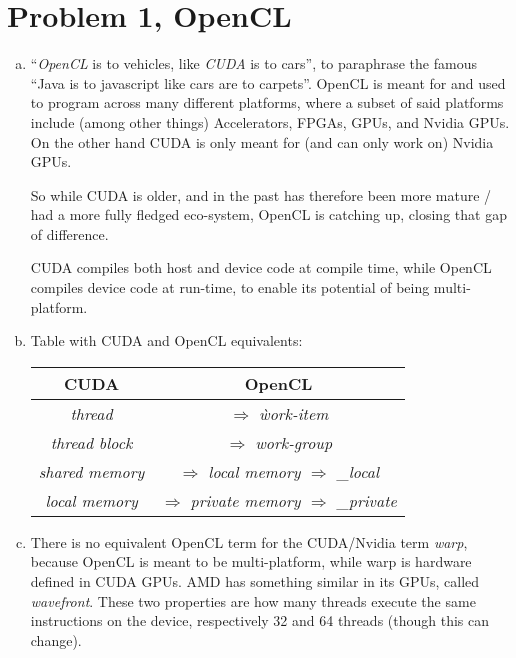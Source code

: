 \documentclass[fontsize=11pt, paper=a4, titlepage]{article}
\begin{document}
\section*{Problem 1, OpenCL}
    \begin{enumerate}[a)]

        \item ``\textit{OpenCL} is to vehicles, like \textit{CUDA} is to cars'',
to paraphrase the famous ``Java is to javascript like cars are to carpets''.
OpenCL is meant for and used to program across many different platforms, where a
subset of said platforms include (among other things) Accelerators, FPGAs, GPUs,
and Nvidia GPUs. On the other hand CUDA is only meant for (and can only work on)
Nvidia GPUs.

So while CUDA is older, and in the past has therefore been more mature / had a
more fully fledged eco-system, OpenCL is catching up, closing that gap of
difference.

CUDA compiles both host and device code at compile time, while OpenCL compiles
device code at run-time, to enable its potential of being multi-platform.

        \item Table with CUDA and OpenCL equivalents:
        \begin{table}[h]
        \begin{center}
            \begin{tabular}{|c|c|}
            \hline
                 \textbf{CUDA}          & \textbf{OpenCL}                                               \\ \hline
                 \textit{thread}        & $\Rightarrow$ \textit{ẁork-item}                              \\ \hline
                 \textit{thread block}  & $\Rightarrow$ \textit{work-group}                             \\ \hline
                 \textit{shared memory} & $\Rightarrow$ \textit{local memory $\Rightarrow$ \_local}     \\ \hline
                 \textit{local memory}  & $\Rightarrow$ \textit{private memory $\Rightarrow$ \_private} \\ \hline
            \end{tabular}
        \end{center}
        \end{table}

        \item There is no equivalent OpenCL term for the CUDA/Nvidia term
\textit{warp}, because OpenCL is meant to be multi-platform, while warp is
hardware defined in CUDA GPUs. AMD has something similar in its GPUs, called
\textit{wavefront}. These two properties are how many threads execute the same
instructions on the device, respectively 32 and 64 threads (though this can
change).


\end{enumerate}
\end{document}

